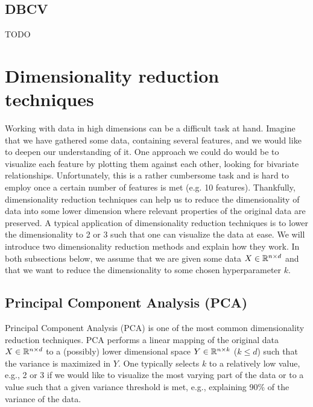 \subsection{DBCV}
TODO

\section{Dimensionality reduction techniques}
Working with data in high dimensions can be a difficult task at hand. Imagine that we have gathered some data, containing several features, and we would like to deepen our understanding of it. One approach we could do would be to visualize each feature by plotting them against each other, looking for bivariate relationships. Unfortunately, this is a rather cumbersome task and is hard to employ once a certain number of features is met (e.g. 10 features). Thankfully, dimensionality reduction techniques can help us to reduce the dimensionality of data into some lower dimension where relevant properties of the original data are preserved. A typical application of dimensionality reduction techniques is to lower the dimensionality to 2 or 3 such that one can visualize the data at ease. We will introduce two dimensionality reduction methods and explain how they work. In both subsections below, we assume that we are given some data $X \in \mathbb{R}^{n \times d}$ and that we want to reduce the dimensionality to some chosen hyperparameter $k$.

\subsection{Principal Component Analysis (PCA)}
Principal Component Analysis (PCA) is one of the most common dimensionality reduction techniques. PCA performs a linear mapping of the original data $X \in \mathbb{R}^{n \times d}$ to a (possibly) lower dimensional space $Y \in \mathbb{R}^{n \times k}$ ($k \leq d$) such that the variance is maximized in $Y$. One typically selects $k$ to a relatively low value, e.g., 2 or 3 if we would like to visualize the most varying part of the data or to a value such that a given variance threshold is met, e.g., explaining 90\% of the variance of the data.

